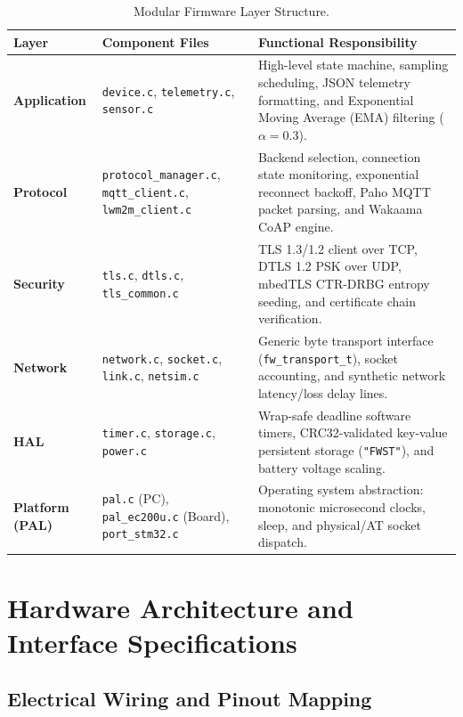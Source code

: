 \documentclass[11pt,a4paper]{article}
\newcommand{\code}[1]{\texttt{#1}}
\begin{document}
\begin{table}[htbp]
\centering
\small
\begin{tabularx}{\textwidth}{l p{5cm} X}
\toprule
\textbf{Layer} & \textbf{Component Files} & \textbf{Functional Responsibility} \\
\midrule
\textbf{Application} & \code{device.c}, \code{telemetry.c}, \code{sensor.c} & High-level state machine, sampling scheduling, JSON telemetry formatting, and Exponential Moving Average (EMA) filtering ($\alpha=0.3$). \\
\addlinespace
\textbf{Protocol} & \code{protocol\_manager.c}, \code{mqtt\_client.c}, \code{lwm2m\_client.c} & Backend selection, connection state monitoring, exponential reconnect backoff, Paho MQTT packet parsing, and Wakaama CoAP engine. \\
\addlinespace
\textbf{Security} & \code{tls.c}, \code{dtls.c}, \code{tls\_common.c} & TLS 1.3/1.2 client over TCP, DTLS 1.2 PSK over UDP, mbedTLS CTR-DRBG entropy seeding, and certificate chain verification. \\
\addlinespace
\textbf{Network} & \code{network.c}, \code{socket.c}, \code{link.c}, \code{netsim.c} & Generic byte transport interface (\code{fw\_transport\_t}), socket accounting, and synthetic network latency/loss delay lines. \\
\addlinespace
\textbf{HAL} & \code{timer.c}, \code{storage.c}, \code{power.c} & Wrap-safe deadline software timers, CRC32-validated key-value persistent storage (\code{"FWST"}), and battery voltage scaling. \\
\addlinespace
\textbf{Platform (PAL)} & \code{pal.c} (PC), \code{pal\_ec200u.c} (Board), \code{port\_stm32.c} & Operating system abstraction: monotonic microsecond clocks, sleep, and physical/AT socket dispatch. \\
\bottomrule
\end{tabularx}
\caption{Modular Firmware Layer Structure.}
\label{tab:firmware_layers}
\end{table}

\section{Hardware Architecture and Interface Specifications}

\subsection{Electrical Wiring and Pinout Mapping}
\end{document}
